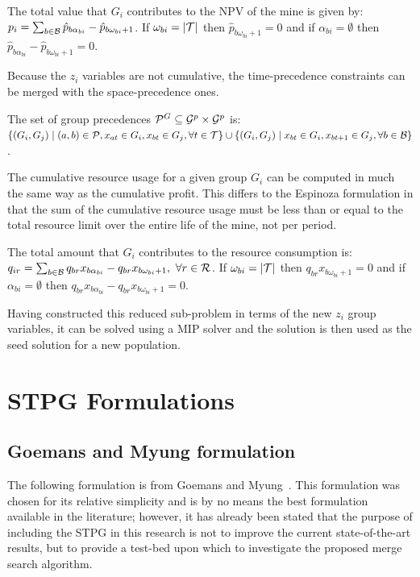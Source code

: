 \documentclass[journal]{IEEEtran}
\begin{document}
\begin{prop}\label{prop:merge-group-profit}
The total value that $G_i$ contributes to the NPV of the mine is given by: $p_i = \sum_{b \in \S{B}} \hat{p}_{b\alpha_{bi}} - \hat{p}_{b\omega_{bi}+1}$. If $\omega_{bi} = |\S{T}|$ then $\hat{p}_{b\omega_{bi}+1} = 0$ and if \(\alpha_{bi} = \emptyset\) then \(\hat{p}_{b\alpha_{bi}} - \hat{p}_{b\omega_{bi}+1} = 0\).
\end{prop}
%
Because the $z_i$ variables are not cumulative, the time-precedence constraints can be merged with the space-precedence ones. 
\begin{prop}\label{prop:merge-group-prec}
The set of group precedences $\mathcal{P}^G \subseteq \S{G}^p \times \S{G}^p$ is: $\{(G_i,G_j) \mid (a,b) \in \mathcal{P}, x_{at} \in G_i, x_{bt} \in G_j, \forall t \in \S{T}\} \cup \{(G_i,G_j) \mid x_{bt} \in G_i, x_{bt+1} \in G_j, \forall b \in \S{B}\}$.
\end{prop}

The cumulative resource usage for a given group $G_i$ can be computed in much the same way as the cumulative profit. This differs to the Espinoza formulation in that the sum of the cumulative resource usage must be less than or equal to the total resource limit over the entire life of the mine, not per period.
\begin{prop}\label{prop:merge-group-resource}
The total amount that $G_i$ contributes to the resource consumption is: $q_{ir} = \sum_{b \in \S{B}} q_{br}x_{b\alpha_{bi}} - q_{br}x_{b\omega_{bi}+1},\ \forall r \in \S{R}$. If $\omega_{bi} = |\S{T}|$ then $q_{br}x_{b\omega_{bi}+1} = 0$ and if \(\alpha_{bi} = \emptyset\) then \(q_{br}x_{b\alpha_{bi}} - q_{br}x_{b\omega_{bi}+1} = 0\).
\end{prop}
%
Having constructed this reduced sub-problem in terms of the new $z_i$ group variables, it can be solved using a MIP solver and the solution is then used as the seed solution for a new population.

\section{STPG Formulations}\label{app:stpg}
\subsection*{Goemans and Myung formulation}
The following formulation is from Goemans and Myung~\cite{goemans}. This formulation was chosen for its relative simplicity and is by no means the best formulation available in the literature; however, it has already been stated that the purpose of including the STPG in this research is not to improve the current state-of-the-art results, but to provide a test-bed upon which to investigate the proposed merge search algorithm.
\end{document}
